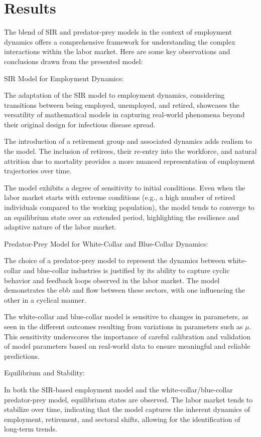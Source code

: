 \documentclass[11pt]{amsart}
\begin{document}
\section{Results}
The blend of SIR and predator-prey models in the context of employment dynamics offers a comprehensive framework for understanding 
the complex interactions within the labor market. Here are some key observations and conclusions drawn from the presented model:

SIR Model for Employment Dynamics:

The adaptation of the SIR model to employment dynamics, considering transitions between being employed, unemployed, and retired, 
showcases the versatility of mathematical models in capturing real-world phenomena beyond their original design for infectious 
disease spread. 

The introduction of a retirement group and associated dynamics adds realism to the model. The inclusion of retirees, 
their re-entry into the workforce, and natural attrition due to mortality provides a more nuanced representation of employment 
trajectories over time.

The model exhibits a degree of sensitivity to initial conditions. Even when the labor market starts with extreme conditions 
(e.g., a high number of retired individuals compared to the working population), the model tends to converge to an equilibrium 
state over an extended period, highlighting the resilience and adaptive nature of the labor market.

Predator-Prey Model for White-Collar and Blue-Collar Dynamics:

The choice of a predator-prey model to represent the dynamics between white-collar and blue-collar industries is justified 
by its ability to capture cyclic behavior and feedback loops observed in the labor market. The model demonstrates the ebb 
and flow between these sectors, with one influencing the other in a cyclical manner.

The white-collar and blue-collar model is sensitive to changes in parameters, as seen in the different outcomes resulting from 
variations in parameters such as $\mu$. This sensitivity underscores the importance of careful calibration and validation of 
model parameters based on real-world data to ensure meaningful and reliable predictions.

Equilibrium and Stability:

In both the SIR-based employment model and the white-collar/blue-collar predator-prey model, equilibrium states are observed. 
The labor market tends to stabilize over time, indicating that the model captures the inherent dynamics of employment, retirement, 
and sectoral shifts, allowing for the identification of long-term trends.
\end{document}
